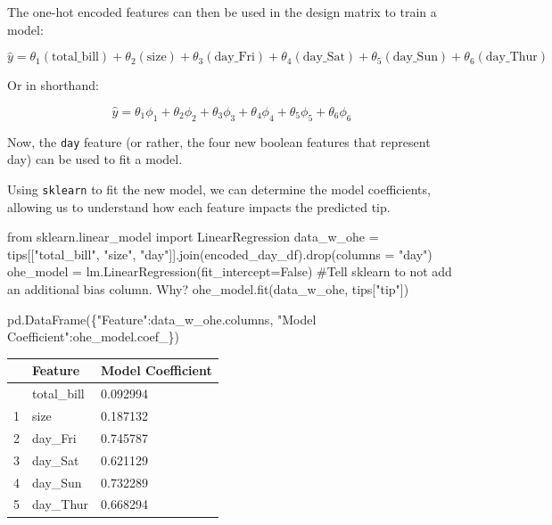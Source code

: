 \documentclass[
  letterpaper,
  DIV=11,
  numbers=noendperiod]{scrreprt}
\newenvironment{Shaded}{\begin{snugshade}}{\end{snugshade}}
\newcommand{\CommentTok}[1]{\textcolor[rgb]{0.37,0.37,0.37}{#1}}
\newcommand{\ImportTok}[1]{\textcolor[rgb]{0.00,0.46,0.62}{#1}}
\newcommand{\NormalTok}[1]{\textcolor[rgb]{0.00,0.23,0.31}{#1}}
\newcommand{\OperatorTok}[1]{\textcolor[rgb]{0.37,0.37,0.37}{#1}}
\newcommand{\StringTok}[1]{\textcolor[rgb]{0.13,0.47,0.30}{#1}}
\newcommand{\VariableTok}[1]{\textcolor[rgb]{0.07,0.07,0.07}{#1}}
\begin{document}
The one-hot encoded features can then be used in the design matrix to
train a model:

\[\hat{y} = \theta_1 (\text{total}\_\text{bill}) + \theta_2 (\text{size}) + \theta_3 (\text{day}\_\text{Fri}) + \theta_4 (\text{day}\_\text{Sat}) + \theta_5 (\text{day}\_\text{Sun}) + \theta_6 (\text{day}\_\text{Thur})\]

Or in shorthand:

\[\hat{y} = \theta_{1}\phi_{1} + \theta_{2}\phi_{2} + \theta_{3}\phi_{3} + \theta_{4}\phi_{4} + \theta_{5}\phi_{5} + \theta_{6}\phi_{6}\]

Now, the \texttt{day} feature (or rather, the four new boolean features
that represent day) can be used to fit a model.

Using \texttt{sklearn} to fit the new model, we can determine the model
coefficients, allowing us to understand how each feature impacts the
predicted tip.

\begin{Shaded}
\begin{Highlighting}[]
\ImportTok{from}\NormalTok{ sklearn.linear\_model }\ImportTok{import}\NormalTok{ LinearRegression}
\NormalTok{data\_w\_ohe }\OperatorTok{=}\NormalTok{ tips[[}\StringTok{"total\_bill"}\NormalTok{, }\StringTok{"size"}\NormalTok{, }\StringTok{"day"}\NormalTok{]].join(encoded\_day\_df).drop(columns }\OperatorTok{=} \StringTok{"day"}\NormalTok{)}
\NormalTok{ohe\_model }\OperatorTok{=}\NormalTok{ lm.LinearRegression(fit\_intercept}\OperatorTok{=}\VariableTok{False}\NormalTok{) }\CommentTok{\#Tell sklearn to not add an additional bias column. Why?}
\NormalTok{ohe\_model.fit(data\_w\_ohe, tips[}\StringTok{"tip"}\NormalTok{])}

\NormalTok{pd.DataFrame(\{}\StringTok{"Feature"}\NormalTok{:data\_w\_ohe.columns, }\StringTok{"Model Coefficient"}\NormalTok{:ohe\_model.coef\_\})}
\end{Highlighting}
\end{Shaded}

\begin{longtable}[]{@{}lll@{}}
\toprule\noalign{}
& Feature & Model Coefficient \\
\midrule\noalign{}
\endhead
\bottomrule\noalign{}
\endlastfoot
0 & total\_bill & 0.092994 \\
1 & size & 0.187132 \\
2 & day\_Fri & 0.745787 \\
3 & day\_Sat & 0.621129 \\
4 & day\_Sun & 0.732289 \\
5 & day\_Thur & 0.668294 \\
\end{longtable}
\end{document}
